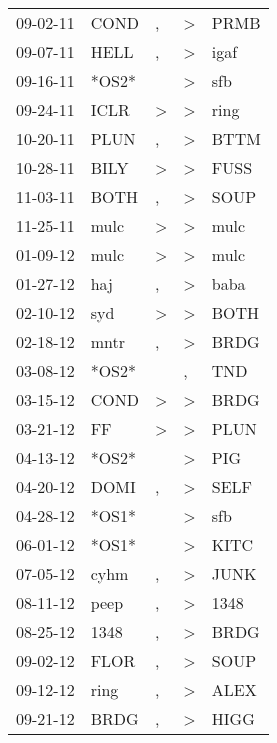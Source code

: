 \begin{supertabular}{lllll}
 09-02-11 &   COND &             , &     \textgreater &   PRMB \\
 09-07-11 &   HELL &             , &     \textgreater &   igaf \\
 09-16-11 &  *OS2* &               &     \textgreater &    sfb \\
 09-24-11 &   ICLR &  \textgreater &     \textgreater &   ring \\
 10-20-11 &   PLUN &             , &     \textgreater &   BTTM \\
 10-28-11 &   BILY &  \textgreater &     \textgreater &   FUSS \\
 11-03-11 &   BOTH &             , &     \textgreater &   SOUP \\
 11-25-11 &   mulc &  \textgreater &     \textgreater &   mulc \\
 01-09-12 &   mulc &  \textgreater &     \textgreater &   mulc \\
 01-27-12 &    haj &             , &     \textgreater &   baba \\
 02-10-12 &    syd &  \textgreater &     \textgreater &   BOTH \\
 02-18-12 &   mntr &             , &     \textgreater &   BRDG \\
 03-08-12 &  *OS2* &               &                , &    TND \\
 03-15-12 &   COND &  \textgreater &     \textgreater &   BRDG \\
 03-21-12 &     FF &  \textgreater &     \textgreater &   PLUN \\
 04-13-12 &  *OS2* &               &     \textgreater &    PIG \\
 04-20-12 &   DOMI &             , &     \textgreater &   SELF \\
 04-28-12 &  *OS1* &               &     \textgreater &    sfb \\
 06-01-12 &  *OS1* &               &     \textgreater &   KITC \\
 07-05-12 &   cyhm &             , &     \textgreater &   JUNK \\
 08-11-12 &   peep &             , &     \textgreater &   1348 \\
 08-25-12 &   1348 &             , &     \textgreater &   BRDG \\
 09-02-12 &   FLOR &             , &     \textgreater &   SOUP \\
 09-12-12 &   ring &             , &     \textgreater &   ALEX \\
 09-21-12 &   BRDG &             , &     \textgreater &   HIGG \\

\end{supertabular}
